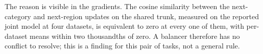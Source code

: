 The reason is visible in the gradients. The cosine similarity between the
next-category and next-region updates on the shared trunk, measured on the reported
joint model at four datasets, is equivalent to zero at
every one of them, with per-dataset means within two thousandths of zero. A balancer
therefore has no conflict to resolve; this is a finding for this pair of tasks, not a
general rule.

